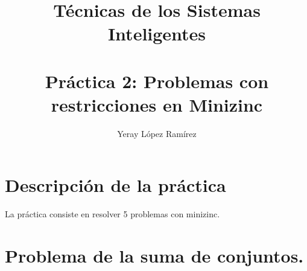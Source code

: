 

\title{Técnicas de los Sistemas Inteligentes\\ \quad\\
	Práctica 2: Problemas con restricciones en Minizinc  \hspace{0.05cm} }   

\author{Yeray López Ramírez	}                             

\renewcommand*\contentsname{hola}

\makeatletter
\let\thetitle\@title
\let\theauthor\@author
\let\thedate\@date
\makeatother





\newpage %
\newcommand{\code}[1]{\colorbox{light-gray}{\textcolor{red}{\texttt{#1}}}}
\newcommand{\high}[1]{\colorbox{light-gray}{\textcolor{yellow}{\texttt{#1}}}}
\newcommand{\highg}[1]{\colorbox{light-gray}{\textcolor{green}{\texttt{#1}}}}

\tableofcontents %

\listoffigures

\listoftables

\newpage


\section*{Descripción de la práctica}

La práctica consiste en resolver 5 problemas con minizinc.


\section{Problema de la suma de conjuntos.}

